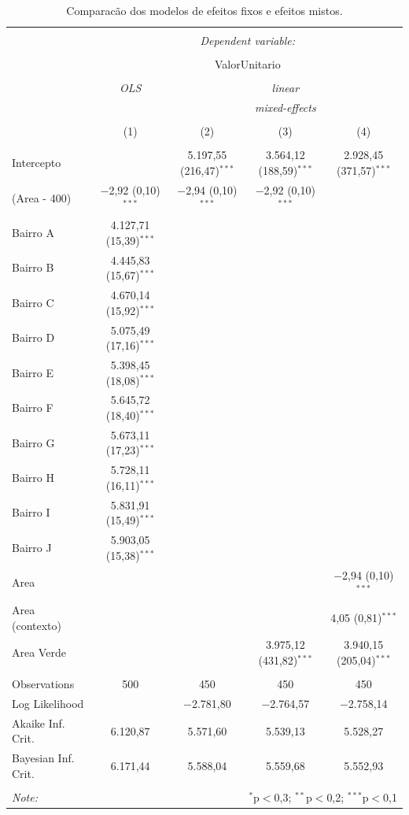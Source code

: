 \documentclass[
  a4paper, 11pt]{article}
\begin{document}
\begin{table}[H] \centering 
  \caption{Comparacão dos modelos de  efeitos fixos e efeitos mistos.} 
  \label{tab:fits} 
\scriptsize 
\begin{tabular}{@{\extracolsep{5pt}}lcccc} 
\\[-1.8ex]\hline 
\hline \\[-1.8ex] 
 & \multicolumn{4}{c}{\textit{Dependent variable:}} \\ 
\cline{2-5} 
\\[-1.8ex] & \multicolumn{4}{c}{ValorUnitario} \\ 
\\[-1.8ex] & \textit{OLS} & \multicolumn{3}{c}{\textit{linear}} \\ 
 & \textit{} & \multicolumn{3}{c}{\textit{mixed-effects}} \\ 
\\[-1.8ex] & (1) & (2) & (3) & (4)\\ 
\hline \\[-1.8ex] 
 Intercepto &  & 5.197,55 (216,47)$^{***}$ & 3.564,12 (188,59)$^{***}$ & 2.928,45 (371,57)$^{***}$ \\ 
  (Area - 400) & $-$2,92 (0,10)$^{***}$ & $-$2,94 (0,10)$^{***}$ & $-$2,92 (0,10)$^{***}$ &  \\ 
  Bairro A & 4.127,71 (15,39)$^{***}$ &  &  &  \\ 
  Bairro B & 4.445,83 (15,67)$^{***}$ &  &  &  \\ 
  Bairro C & 4.670,14 (15,92)$^{***}$ &  &  &  \\ 
  Bairro D & 5.075,49 (17,16)$^{***}$ &  &  &  \\ 
  Bairro E & 5.398,45 (18,08)$^{***}$ &  &  &  \\ 
  Bairro F & 5.645,72 (18,40)$^{***}$ &  &  &  \\ 
  Bairro G & 5.673,11 (17,23)$^{***}$ &  &  &  \\ 
  Bairro H & 5.728,11 (16,11)$^{***}$ &  &  &  \\ 
  Bairro I & 5.831,91 (15,49)$^{***}$ &  &  &  \\ 
  Bairro J & 5.903,05 (15,38)$^{***}$ &  &  &  \\ 
  Area &  &  &  & $-$2,94 (0,10)$^{***}$ \\ 
  Area (contexto) &  &  &  & 4,05 (0,81)$^{***}$ \\ 
  Area Verde &  &  & 3.975,12 (431,82)$^{***}$ & 3.940,15 (205,04)$^{***}$ \\ 
 \hline \\[-1.8ex] 
Observations & 500 & 450 & 450 & 450 \\ 
Log Likelihood &  & $-$2.781,80 & $-$2.764,57 & $-$2.758,14 \\ 
Akaike Inf. Crit. & 6.120,87 & 5.571,60 & 5.539,13 & 5.528,27 \\ 
Bayesian Inf. Crit. & 6.171,44 & 5.588,04 & 5.559,68 & 5.552,93 \\ 
\hline 
\hline \\[-1.8ex] 
\textit{Note:}  & \multicolumn{4}{r}{$^{*}$p$<$0,3; $^{**}$p$<$0,2; $^{***}$p$<$0,1} \\ 
\end{tabular} 
\end{table}
\end{document}
